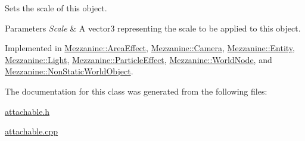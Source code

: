 Sets the scale of this object. 


\begin{DoxyParams}{Parameters}
{\em Scale} & A vector3 representing the scale to be applied to this object. \\
\hline
\end{DoxyParams}


Implemented in \hyperlink{classMezzanine_1_1AreaEffect_ae0448d98c3689ae407734bbcd85a08cb}{Mezzanine::AreaEffect}, \hyperlink{classMezzanine_1_1Camera_ad49a68805d03d18d7ca42c9fbc54db2b}{Mezzanine::Camera}, \hyperlink{classMezzanine_1_1Entity_a91b2952a411d8ed80e0f809944c591b4}{Mezzanine::Entity}, \hyperlink{classMezzanine_1_1Light_a643fa07c0b48ec2edad53e3c27345ab9}{Mezzanine::Light}, \hyperlink{classMezzanine_1_1ParticleEffect_a4d8ab250edb3e6f8ba8c60710ccd6c0a}{Mezzanine::ParticleEffect}, \hyperlink{classMezzanine_1_1WorldNode_a3f7797ef81aaf763cdf011728f6b6b05}{Mezzanine::WorldNode}, and \hyperlink{classMezzanine_1_1NonStaticWorldObject_a03fec7fb4abcd6747695d139d00c7662}{Mezzanine::NonStaticWorldObject}.



The documentation for this class was generated from the following files:\begin{DoxyCompactItemize}
\item 
\hyperlink{attachable_8h}{attachable.h}\item 
\hyperlink{attachable_8cpp}{attachable.cpp}\end{DoxyCompactItemize}
